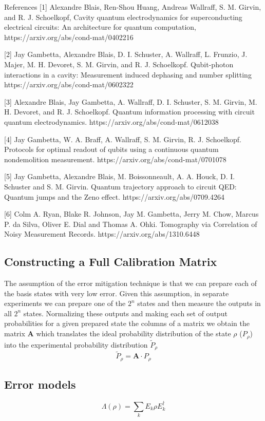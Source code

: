 \documentclass[11pt, oneside]{article}   	%
\begin{document}
References
[1] Alexandre Blais, Ren-Shou Huang, Andreas Wallraff, S. M. Girvin, and R. J. Schoelkopf, Cavity quantum electrodynamics for superconducting electrical circuits: An architecture for quantum computation, https://arxiv.org/abs/cond-mat/0402216

[2] Jay Gambetta, Alexandre Blais, D. I. Schuster, A. Wallraff, L. Frunzio, J. Majer, M. H. Devoret, S. M. Girvin, and R. J. Schoelkopf. Qubit-photon interactions in a cavity: Measurement induced dephasing and number splitting https://arxiv.org/abs/cond-mat/0602322

[3] Alexandre Blais, Jay Gambetta, A. Wallraff, D. I. Schuster, S. M. Girvin, M. H. Devoret, and R. J. Schoelkopf. Quantum information processing with circuit quantum electrodynamics. https://arxiv.org/abs/cond-mat/0612038

[4] Jay Gambetta, W. A. Braff, A. Wallraff, S. M. Girvin, R. J. Schoelkopf. Protocols for optimal readout of qubits using a continuous quantum nondemolition measurement. https://arxiv.org/abs/cond-mat/0701078

[5] Jay Gambetta, Alexandre Blais, M. Boissonneault, A. A. Houck, D. I. Schuster and S. M. Girvin. Quantum trajectory approach to circuit QED: Quantum jumps and the Zeno effect. https://arxiv.org/abs/0709.4264

[6] Colm A. Ryan, Blake R. Johnson, Jay M. Gambetta, Jerry M. Chow, Marcus P. da Silva, Oliver E. Dial and Thomas A. Ohki. Tomography via Correlation of Noisy Measurement Records. https://arxiv.org/abs/1310.6448

\subsection{Constructing a Full Calibration Matrix}
The assumption of the error mitigation technique is that we can prepare each of the basis states with very low error. Given this assumption, in separate experiments we can prepare one of the $2^n$ states and then measure the outputs in all $2^n$ states. Normalizing these outputs and making each set of output probabilities for a given prepared state the columns of a matrix we obtain the matrix $\mathbf{A}$ which translates the ideal probability distribution of the state $\rho$ ($P_\rho$) into the experimental probability distribution $\tilde{P}_{\rho}$ 
\begin{equation}
\tilde{P}_{\rho} = \mathbf{A} \cdot P_{\rho}
\end{equation}

\subsection{Error models}
\begin{equation}
\Lambda(\rho) = \sum_k E_k \rho E^{\dagger}_k
\end{equation}
\end{document}

